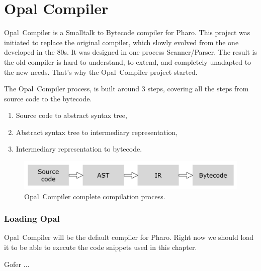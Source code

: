 \documentclass[a4paper,10pt,twoside]{book}
\begin{document}
	\renewcommand{\nnbb}[2]{} %
	\sloppy
\fi


\newcommand{\opal}[0]{Opal~Compiler } %
\chapter{Opal Compiler} 


\opal is a Smalltalk to Bytecode compiler for Pharo. This project was initiated to replace the original compiler, which slowly evolved from the one developed in the 80s. It was designed in one process Scanner/Parser. The result is the old compiler is hard to understand, to extend, and completely unadapted to the new needs. That's why the \opal project started. 

The \opal process, is built around 3 steps, covering all the steps from source code to the bytecode.

\begin{enumerate}
\item Source code to abstract syntax tree,
\item Abstract syntax tree to intermediary representation,
\item Intermediary representation to bytecode.
\end{enumerate}

\begin{figure}[ht]\centering
	\includegraphics[width=\linewidth]{fullProcess}
	\caption{\opal complete compilation process. }
\end{figure}


\subsection{Loading Opal}

\opal will be the default compiler for Pharo. Right now we should load it to be able to execute the code snippets used in this chapter.

\begin{code}{}
Gofer
	...
	

\end{code}
\end{document}
